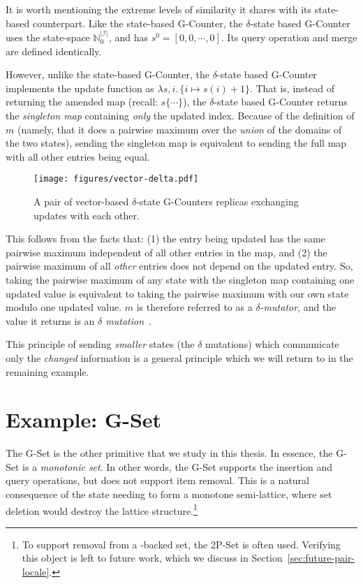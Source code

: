 It is worth mentioning the extreme levels of similarity it shares with its
state-based counterpart. Like the state-based G-Counter, the $\delta$-state
based G-Counter uses the state-space $\mathbb{N}^{|\mathcal{I}|}_0$, and has
$s^0 = [0, 0, \cdots, 0]$. Its query operation and merge are defined
identically.

However, unlike the state-based G-Counter, the $\delta$-state based G-Counter
implements the update function as $\lambda s,i.\, \{ i \mapsto s(i) + 1\}$. That
is, instead of returning the amended map (recall: $s\{ \cdots \}$), the
$\delta$-state based G-Counter returns the \emph{singleton map} containing
\emph{only} the updated index. Because of the definition of $m$ (namely, that it
does a pairwise maximum over the \emph{union} of the domains of the two states),
sending the singleton map is equivalent to sending the full map with all other
entries being equal.

\begin{figure}[H]
  \centering
  \texttt{[image: figures/vector-delta.pdf]}
  \caption{A pair of vector-based $\delta$-state G-Counters replicas exchanging
    updates with each other.}
\end{figure}

This follows from the facts that: (1) the entry being updated has the same
pairwise maximum independent of all other entries in the map, and (2) the
pairwise maximum of all \emph{other} entries does not depend on the updated
entry. So, taking the pairwise maximum of any state with the singleton map
containing one updated value is equivalent to taking the pairwise maximum with
our own state modulo one updated value. $m$ is therefore referred to as a
\emph{$\delta$-mutator}, and the value it returns is an \emph{$\delta$
mutation}~\citep{almedia18}.

This principle of sending \emph{smaller} states (the $\delta$ mutations) which
communicate only the \emph{changed} information is a general principle which
we will return to in the remaining example.

\section{Example: G-Set}
\label{sec:example-gset}

The G-Set is the other primitive \CRDT that we study in this thesis. In essence,
the G-Set is a \emph{monotonic set}. In other words, the G-Set supports the
insertion and query operations, but does not support item removal. This
is a natural consequence of the state needing to form a monotone semi-lattice,
where set deletion would destroy the lattice structure.\footnote{To support
removal from a \CRDT-backed set, the 2P-Set is often used. Verifying this object
is left to future work, which we discuss in
Section~\ref{sec:future-pair-locale}.}

